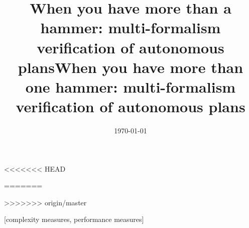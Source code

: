 \documentclass{sig-alternate}
\begin{document}
%

<<<<<<< HEAD
\title{When you have more than a hammer: multi-formalism verification of autonomous plans}
=======
\title{When you have more than one hammer: multi-formalism verification of autonomous plans}
>>>>>>> origin/master
\date{\today}

\maketitle



[complexity measures, performance measures]





 



%






\end{document}
